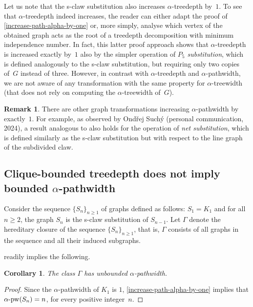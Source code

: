 \documentclass[11pt]{article}
\newcommand{\pw}{\mathrm{pw}}
\newcommand{\pin}{\alpha \textnormal{-} \pw}
\theoremstyle{plain}
\newtheorem{corollary}[theorem]{Corollary}
\theoremstyle{definition}
\newtheorem{remark}[theorem]{Remark}
\theoremstyle{remark}
\numberwithin{equation}{section}
\begin{document}
Let us note that the s-claw substitution also increases $\alpha$-treedepth by~$1$.
To see that $\alpha$-treedepth indeed increases, the reader can either adapt the proof of \cref{increase-path-alpha-by-one} or, more simply, analyse which vertex of the obtained graph acts as the root of a treedepth decomposition with minimum independence number.
In fact, this latter proof approach shows that $\alpha$-treedepth is increased exactly by~$1$ also by the simpler operation of \emph{$P_5$ substitution}, which is defined analogously to the s-claw substitution, but requiring only two copies of~$G$ instead of three.
However, in contrast with $\alpha$-treedepth and $\alpha$-pathwidth, we are not aware of any transformation with the same property for $\alpha$-treewidth (that does not rely on computing the $\alpha$-treewidth of~$G$).

\begin{remark}\label{rem:suchy}
There are other graph transformations increasing $\alpha$-pathwidth by exactly~$1$.
For example, as observed by Ond\v{r}ej Such\'y (personal communication, 2024), a result analogous to  also holds for the operation of \emph{net substitution}, which is defined similarly as the s-claw substitution but with respect to the line graph of the subdivided claw.
\end{remark}

\subsection{Clique-bounded treedepth does not imply bounded \texorpdfstring{$\alpha$}{α}-pathwidth}\label{sec:bddtd-not-alpha-bdd-pw}   
Consider the sequence $\{S_n\}_{n\ge 1}$ of graphs defined as follows:
$S_1 = K_1$ and for all $n\ge 2$, the graph $S_n$ is the s-claw substitution of $S_{n-1}$.
Let $\Gamma$ denote the hereditary closure of the sequence $\{S_n\}_{n\ge 1}$, that is, $\Gamma$ consists of all graphs in the sequence and all their induced subgraphs.

 readily implies the following.

\begin{corollary}\label{cor:gamma-unbounded-alpha-pathwidth}
The class $\Gamma$ has unbounded $\alpha$-pathwidth.
\end{corollary}

\begin{proof}
Since the $\alpha$-pathwidth of $K_1$ is $1$, \cref{increase-path-alpha-by-one} implies that $\pin(S_n) = n$, for every positive integer~$n$.
\end{proof}
\end{document}
